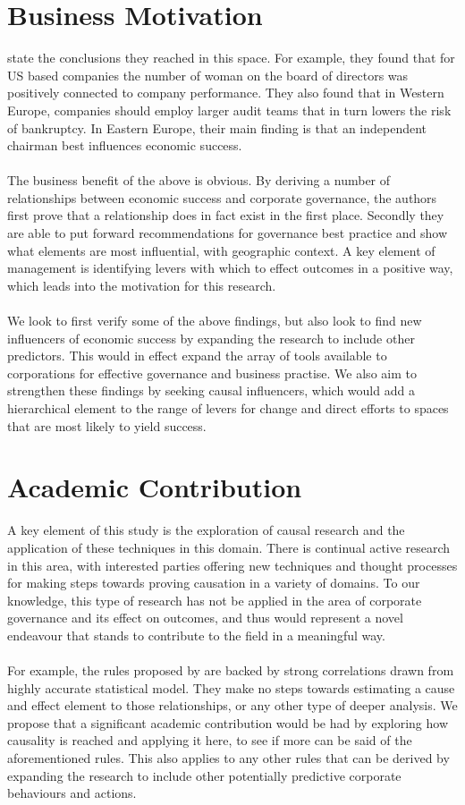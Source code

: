 \section{Business Motivation}
{\cite{moldovan2015learning} state the conclusions they reached in this space. For example, they found that for US based companies the number of woman on the board of directors was positively connected to company performance. They also found that in Western Europe, companies should employ larger audit teams that in turn lowers the risk of bankruptcy. In Eastern Europe, their main finding is that an independent chairman best influences economic success.\\\\ 
The business benefit of the above is obvious. By deriving a number of relationships between economic success and corporate governance, the authors first prove that a relationship does in fact exist in the first place. Secondly they are able to put forward recommendations for governance best practice and show what elements are most influential, with geographic context. A key element of management is identifying levers with which to effect outcomes in a positive way, which leads into the motivation for this research.\\\\
We look to first verify some of the above findings, but also look to find new influencers of economic success by expanding the research to include other predictors. This would in effect expand the array of tools available to corporations for effective governance and business practise. We also aim to strengthen these findings by seeking causal influencers, which would add a hierarchical element to the range of levers for change and direct efforts to spaces that are most likely to yield success. }
\section{Academic Contribution}
{A key element of this study is the exploration of causal research and the application of these techniques in this domain. There is continual active research in this area, with interested parties offering new techniques and thought processes for making steps towards proving causation in a variety of domains. To our knowledge, this type of research has not be applied in the area of corporate governance and its effect on outcomes, and thus would represent a novel endeavour that stands to contribute to the field in a meaningful way. \\\\ 
For example, the rules proposed by \cite{moldovan2015learning} are backed by strong correlations drawn from highly accurate statistical model. They make no steps towards estimating a cause and effect element to those relationships, or any other type of deeper analysis. We propose that a significant academic contribution would be had by exploring how causality is reached and applying it here, to see if more can be said of the aforementioned rules. This also applies to any other rules that can be derived by expanding the research to include other potentially predictive corporate behaviours and actions. }

